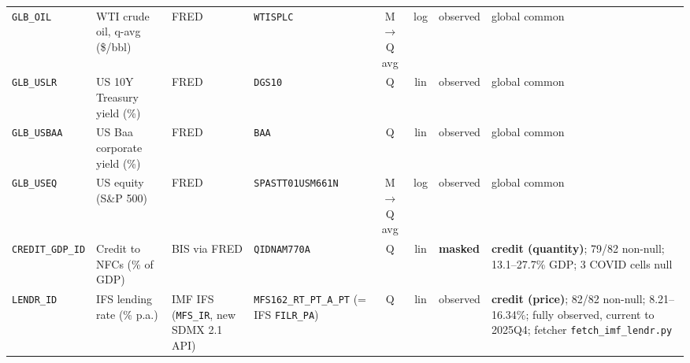 {\begin{longtable}{@{}llp{2.5cm}p{2.4cm}cclp{2.6cm}@{}}
\texttt{GLB\_OIL} & WTI crude oil, q-avg (\$/bbl) & FRED & \texttt{WTISPLC} & M$\to$Q avg & log & observed & global common \\
\texttt{GLB\_USLR} & US 10Y Treasury yield (\%) & FRED & \texttt{DGS10} & Q & lin & observed & global common \\
\texttt{GLB\_USBAA} & US Baa corporate yield (\%) & FRED & \texttt{BAA} & Q & lin & observed & global common \\
\texttt{GLB\_USEQ} & US equity (S\&P 500) & FRED & \texttt{SPASTT01USM661N} & M$\to$Q avg & log & observed & global common \\
\texttt{CREDIT\_GDP\_ID} & Credit to NFCs (\% of GDP) & BIS via FRED & \texttt{QIDNAM770A} & Q & lin & \textbf{masked} & \textbf{credit (quantity)}; 79/82 non-null; 13.1--27.7\% GDP; 3 COVID cells null \\
\texttt{LENDR\_ID} & IFS lending rate (\% p.a.) & IMF IFS (\texttt{MFS\_IR}, new SDMX 2.1 API) & \texttt{MFS162\_RT\_PT\_A\_PT} (= IFS \texttt{FILR\_PA}) & Q & lin & observed & \textbf{credit (price)}; 82/82 non-null; 8.21--16.34\%; fully observed, current to 2025Q4; fetcher \texttt{fetch\_imf\_lendr.py} \\
\end{longtable}}

